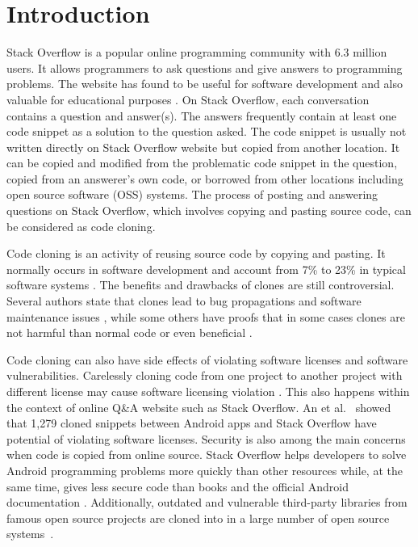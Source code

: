 \documentclass[sigconf,review, anonymous]{acmart}
\begin{document}
\section{Introduction}
Stack Overflow is a popular online programming community with 6.3 million users. It allows programmers to ask questions and give answers to programming problems. The website has found to be useful for software development \cite{Ponzanelli2013,Ponzanelli2014,Diamantopoulos2015,Keivanloo2014,Park2014, Stolee2014,Subramanian2013,Diamantopoulos2015,Treude2016} and also valuable for educational purposes \cite{Nasehi2012}. On Stack Overflow, each conversation contains a question and answer(s).  The answers frequently contain at least one code snippet as a solution to the question asked. The code snippet is usually not written directly on Stack Overflow website but copied from another location. It can be copied and modified from the problematic code snippet in the question, copied from an answerer's own code, or borrowed from other locations including open source software (OSS) systems. The process of posting and answering questions on Stack Overflow, which involves copying and pasting source code, can be considered as code cloning. 

Code cloning is an activity of reusing source code by copying and pasting. It normally occurs in software development and account from 7\% to 23\% in typical software systems \cite{Bellon2007}. The benefits and drawbacks of clones are still controversial. Several authors state that clones lead to bug propagations and software maintenance issues \cite{Kamiya2002}, while some others have proofs that in some cases clones are not harmful than normal code or even beneficial \cite{Saini2016,Kapser2006}. 

Code cloning can also have side effects of violating software licenses and software vulnerabilities. Carelessly cloning code from one project to another project with different license may cause software licensing violation \cite{German2009}. This also happens within the context of online Q\&A website such as Stack Overflow. An et al.~\cite{An2017} showed that 1,279 cloned snippets between Android apps and Stack Overflow have potential of violating software licenses. Security is also among the main concerns when code is copied from online source. Stack Overflow helps developers to solve Android programming problems more quickly than other resources while, at the same time, gives less secure code than books and the official Android documentation \cite{Acar2016}. Additionally, outdated and vulnerable third-party libraries from famous open source projects are cloned into in a large number of open source systems~\cite{Xia2014}.
\end{document}
